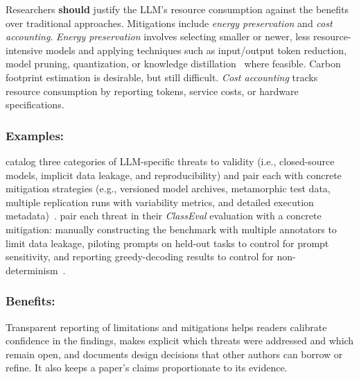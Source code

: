 \documentclass[smallextended]{svjour3}
\newcommand{\should}{\textbf{should}\xspace}
\newcommand{\guidelinesubsubsection}[1]{\subsubsection{\bfseries #1:}}
\newcommand{\guidelinesubsubsection}[1]{\subsubsection{#1}}
\begin{document}
Researchers \should justify the LLM's resource consumption against the benefits over traditional approaches.
Mitigations include \emph{energy preservation} and \emph{cost accounting}. \emph{Energy preservation} involves selecting smaller or newer, less resource-intensive models and applying techniques such as input/output token reduction, model pruning, quantization, or knowledge distillation~\cite{mitu2024hidden} where feasible. Carbon footprint estimation is desirable, but still difficult. \emph{Cost accounting} tracks resource consumption by reporting tokens, service costs, or hardware specifications.

\guidelinesubsubsection{Examples}

\citeauthor{DBLP:conf/icse/SallouDP24} catalog three categories of LLM-specific threats to validity (i.e., closed-source models, implicit data leakage, and reproducibility) and pair each with concrete mitigation strategies (e.g., versioned model archives, metamorphic test data, multiple replication runs with variability metrics, and detailed execution metadata)~\cite{DBLP:conf/icse/SallouDP24}.
\citeauthor{DBLP:conf/icse/Du0WWL0FS0L24} pair each threat in their \emph{ClassEval} evaluation with a concrete mitigation: manually constructing the benchmark with multiple annotators to limit data leakage, piloting prompts on held-out tasks to control for prompt sensitivity, and reporting greedy-decoding results to control for non-determinism~\cite{DBLP:conf/icse/Du0WWL0FS0L24}.

\guidelinesubsubsection{Benefits}

Transparent reporting of limitations and mitigations helps readers calibrate confidence in the findings, makes explicit which threats were addressed and which remain open, and documents design decisions that other authors can borrow or refine. It also keeps a paper's claims proportionate to its evidence.
\end{document}
